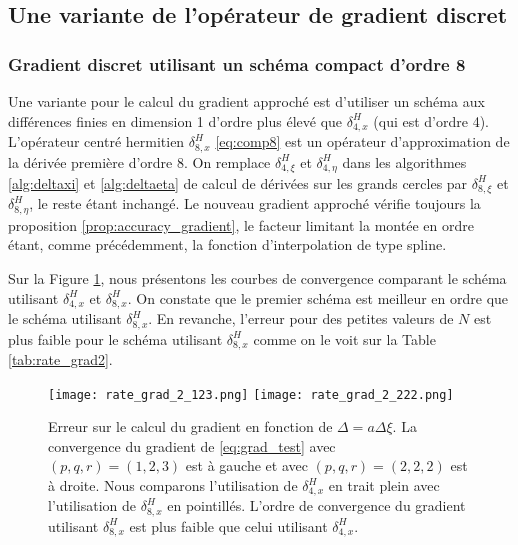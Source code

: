\subsection{Une variante de l'opérateur de gradient discret}


\subsubsection{Gradient discret utilisant un schéma compact d'ordre 8}

Une variante pour le calcul du gradient approché est d'utiliser un schéma aux différences finies en dimension 1 d'ordre plus élevé que $\delta_{4,x}^H$ (qui est d'ordre 4). 
L'opérateur centré hermitien $\delta_{8,x}^H$ \eqref{eq:comp8} est un opérateur d'approximation de la dérivée première d'ordre $8$.
On remplace $\delta_{4, \xi}^H$ et $\delta_{4, \eta}^H$ dans les algorithmes \ref{alg:deltaxi} et \ref{alg:deltaeta} de calcul de dérivées sur les grands cercles par $\delta_{8, \xi}^H$ et $\delta_{8, \eta}^H$, le reste étant inchangé. Le nouveau gradient approché vérifie toujours la proposition \ref{prop:accuracy_gradient}, le facteur limitant la montée en ordre étant, comme précédemment, la fonction d'interpolation de type spline.

Sur la Figure \ref{fig:rate_grad2}, nous présentons les courbes de convergence comparant le schéma utilisant $\delta^H_{4,x}$ et $\delta^H_{8,x}$. On constate que le premier schéma est meilleur en ordre que le schéma utilisant $\delta^H_{8,x}$. En revanche, l'erreur pour des petites valeurs de $N$ est plus faible pour le schéma utilisant $\delta^H_{8,x}$ comme on le voit sur la Table \ref{tab:rate_grad2}.

\begin{figure}[htbp]
\begin{center}
\texttt{[image: rate\_grad\_2\_123.png]}
\texttt{[image: rate\_grad\_2\_222.png]}
\end{center}
\caption{Erreur sur le calcul du gradient en fonction de $\Delta = a\Delta \xi$. La convergence du gradient de \eqref{eq:grad_test} avec $(p,q,r)=(1,2,3)$ est à gauche et avec $(p,q,r)=(2,2,2)$ est à droite. Nous comparons l'utilisation de $\delta^H_{4,x}$ en trait plein avec l'utilisation de $\delta^H_{8,x}$ en pointillés. L'ordre de convergence du gradient utilisant $\delta^H_{8,x}$ est plus faible que celui utilisant $\delta^H_{4,x}$.}
\label{fig:rate_grad2}
\end{figure}



